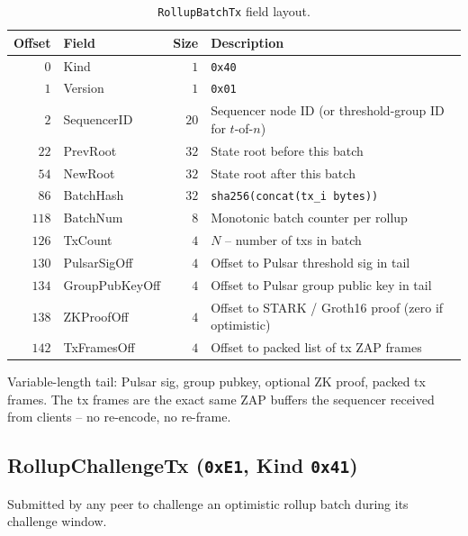 \begin{table}[h]
\centering
\small
\begin{tabular}{@{}rlrp{6cm}@{}}
\toprule
\textbf{Offset} & \textbf{Field} & \textbf{Size} & \textbf{Description} \\
\midrule
$0$ & Kind & $1$ & \texttt{0x40} \\
$1$ & Version & $1$ & \texttt{0x01} \\
$2$ & SequencerID & $20$ & Sequencer node ID (or threshold-group ID for $t$-of-$n$) \\
$22$ & PrevRoot & $32$ & State root before this batch \\
$54$ & NewRoot & $32$ & State root after this batch \\
$86$ & BatchHash & $32$ & \texttt{sha256(concat(tx\_i bytes))} \\
$118$ & BatchNum & $8$ & Monotonic batch counter per rollup \\
$126$ & TxCount & $4$ & $N$ -- number of txs in batch \\
$130$ & PulsarSigOff & $4$ & Offset to Pulsar threshold sig in tail \\
$134$ & GroupPubKeyOff & $4$ & Offset to Pulsar group public key in tail \\
$138$ & ZKProofOff & $4$ & Offset to STARK / Groth16 proof (zero if optimistic) \\
$142$ & TxFramesOff & $4$ & Offset to packed list of tx ZAP frames \\
\bottomrule
\end{tabular}
\caption{\texttt{RollupBatchTx} field layout.}
\label{tab:batchtx}
\end{table}

Variable-length tail: Pulsar sig, group pubkey, optional ZK proof,
packed tx frames. The tx frames are the exact same ZAP buffers the
sequencer received from clients -- no re-encode, no re-frame.

\subsection{RollupChallengeTx (\texttt{0xE1}, Kind \texttt{0x41})}

Submitted by any peer to challenge an optimistic rollup batch
during its challenge window.

